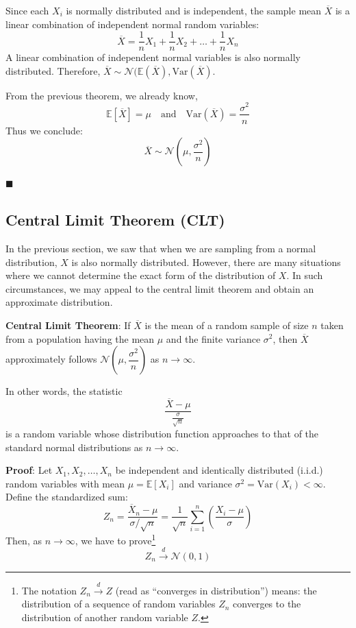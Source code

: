 \documentclass[twoside]{book}
\begin{document}
Since each \( X_i \) is normally distributed and is independent, the sample mean \( \overline{X} \) is a linear combination of independent normal random variables:
\[
\overline{X} = \frac{1}{n} X_1 + \frac{1}{n} X_2 + \dots + \frac{1}{n} X_n
\]
A linear combination of independent normal variables is also normally distributed. Therefore, \( \overline{X} \sim \mathcal{N}(\mathbb{E}(\overline{X}), \mathrm{Var}(\overline{X}) \).

From the previous theorem, we already know,
\[
\mathbb{E}[\overline{X}] = \mu \quad \text{and} \quad \mathrm{Var}(\overline{X}) = \frac{\sigma^2}{n}
\]
Thus we conclude:
\[
\overline{X} \sim \mathcal{N}\left( \mu, \frac{\sigma^2}{n} \right)
\]

\hfill $\blacksquare$
\subsection{Central Limit Theorem (CLT)}
In the previous section, we saw that when we are sampling from a normal distribution, $X$ is also normally distributed. However, there are many situations where we cannot determine the exact form of the distribution of
$X$. In such circumstances, we may appeal to the central limit theorem and obtain an approximate distribution.

\begin{textbox}
\textbf{Central Limit Theorem}: If $\overline{X}$ is the mean of a random sample of size $n$ taken from a population having the mean $\mu$ and the finite variance $\sigma^2$, then $\overline{X}$ approximately follows $\mathcal{N}\left(\mu, \dfrac{\sigma^2}{n}\right)$ as $n \to \infty$. 

In other words, the statistic
$$\dfrac{\overline{X}-\mu}{\frac{\sigma}{\sqrt{n}}}$$
is a random variable whose distribution function approaches to that of the standard normal distributions as $n \to \infty$.
\end{textbox}
\textbf{Proof}: Let $X_1, X_2, \dots, X_n$ be independent and identically distributed (i.i.d.) random variables with mean $\mu = \mathbb{E}[X_i]$ and variance $\sigma^2 = \text{Var}(X_i) < \infty$. Define the standardized sum:
\[
Z_n = \frac{\overline{X}_n - \mu}{\sigma / \sqrt{n}} = \frac{1}{\sqrt{n}} \sum_{i=1}^n \left( \frac{X_i - \mu}{\sigma} \right)
\]
Then, as $n \to \infty$, we have to prove\footnote{The notation \( Z_n \xrightarrow{d} Z \) (read as ``converges in distribution'') means: the distribution of a sequence of random variables \( Z_n \) converges to the distribution of another random variable \( Z \).}
\[
Z_n \xrightarrow{d} \mathcal{N}(0,1)
\]
\end{document}
